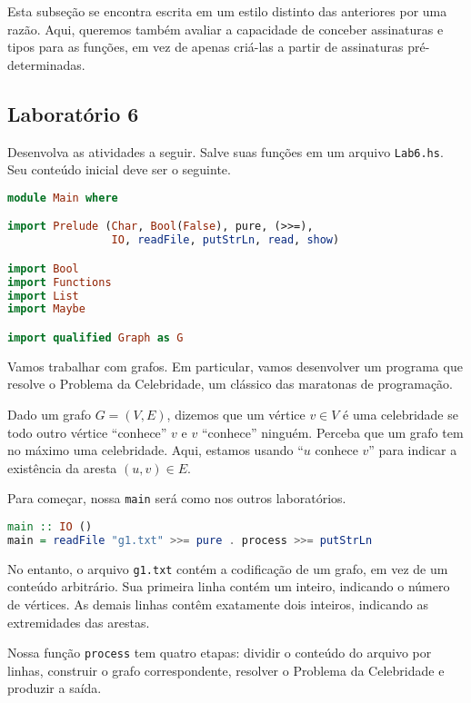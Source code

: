 \documentclass[a4paper]{article}
\begin{document}
Esta subseção se encontra escrita em um estilo distinto das anteriores por uma razão.
Aqui, queremos também avaliar a capacidade de conceber assinaturas e tipos para as funções, em vez de apenas criá-las a partir de assinaturas pré-determinadas.

\subsection{Laboratório 6}

Desenvolva as atividades a seguir.
Salve suas funções em um arquivo \texttt{Lab6.hs}.
Seu conteúdo inicial deve ser o seguinte.

\begin{lstlisting}[language=haskell, frame=single]
module Main where

import Prelude (Char, Bool(False), pure, (>>=),
                IO, readFile, putStrLn, read, show)

import Bool
import Functions
import List
import Maybe

import qualified Graph as G
\end{lstlisting}

Vamos trabalhar com grafos.
Em particular, vamos desenvolver um programa que resolve o Problema da Celebridade, um clássico das maratonas de programação.

Dado um grafo $G = (V, E)$, dizemos que um vértice $v \in V$ é uma celebridade se todo outro vértice ``conhece'' $v$ e $v$ ``conhece'' ninguém.
Perceba que um grafo tem no máximo uma celebridade.
Aqui, estamos usando ``$u$ conhece $v$'' para indicar a existência da aresta $(u, v) \in E$.

Para começar, nossa \texttt{main} será como nos outros laboratórios.

\begin{lstlisting}[language=haskell, frame=single]
main :: IO ()
main = readFile "g1.txt" >>= pure . process >>= putStrLn
\end{lstlisting}

No entanto, o arquivo \texttt{g1.txt} contém a codificação de um grafo, em vez de um conteúdo arbitrário.
Sua primeira linha contém um inteiro, indicando o número de vértices.
As demais linhas contêm exatamente dois inteiros, indicando as extremidades das arestas.

Nossa função \texttt{process} tem quatro etapas: dividir o conteúdo do arquivo por linhas, construir o grafo correspondente, resolver o Problema da Celebridade e produzir a saída.
\end{document}
